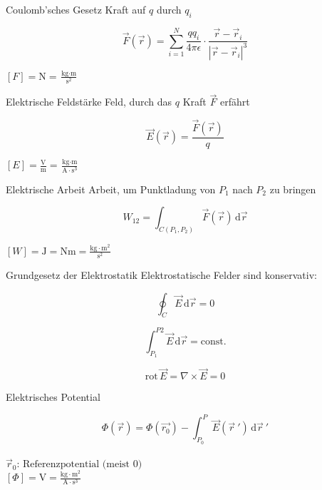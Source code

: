 \documentclass[a7paper]{kartei}
\begin{document}
\setlength{\parindent}{0pt} %

\begin{karte}[Elektrostatik]{Coulomb’sches Gesetz}
Kraft auf \( q \) durch \( q_i \)

\[
\vec{F}(\vec{r}) = \sum_{i=1}^{N} \frac{q q_i}{4\pi\epsilon} \cdot \frac{\vec{r} - \vec{r}_i}{|\vec{r} - \vec{r}_i|^3}
\]

\([F] = \text{N} = \frac{\text{kg} \cdot \text{m}}{\text{s}^2}\)
\end{karte}

\begin{karte}[Elektrostatik]{Elektrische Feldstärke}
Feld, durch das \( q \) Kraft \( \vec{F} \) erfährt

\[
\vec{E}(\vec{r}) = \frac{\vec{F}(\vec{r})}{q}
\]

\([E] = \frac{\text{V}}{\text{m}} = \frac{\text{kg} \cdot \text{m}}{\text{A} \cdot \text{s}^3}\)
\end{karte}

\begin{karte}[Elektrostatik]{Elektrische Arbeit}
Arbeit, um Punktladung von \( P_1 \) nach \( P_2 \) zu bringen

\[
W_{12} = \int_{C(P_1, P_2)} \vec{F}(\vec{r}) \, \mathrm{d}\vec{r}
\]

\([W] = \text{J} = \text{Nm} = \frac{\text{kg} \cdot \text{m}^2}{\text{s}^2}\)
\end{karte}

\begin{karte}[Elektrostatik]{Grundgesetz der Elektrostatik}
Elektrostatische Felder sind konservativ:

\[
\oint_C \vec{E} \, \mathrm{d}\vec{r} = 0
\]

\[
\int_{P_1}^{P2} \vec{E} \, \mathrm{d}\vec{r} = \text{const.}
\]

\[\text{rot} \, \vec{E} = \nabla \times \vec{E} = 0\]

\end{karte}

\begin{karte}[Elektrostatik]{Elektrisches Potential}

\[
\Phi(\vec{r}) = \Phi(\vec{r_0}) - \int_{P_0}^{P} \vec{E}(\vec{r}\ ') \, \mathrm{d}\vec{r} \ '
\]
\\
\(
\vec{r}_0 \text{: Referenzpotential (meist 0)}
\)
\\

\([\Phi] = \text{V} = \frac{\text{kg} \cdot \text{m}^2}{\text{A} \cdot \text{s}^3}\)
\end{karte}
\end{document}
